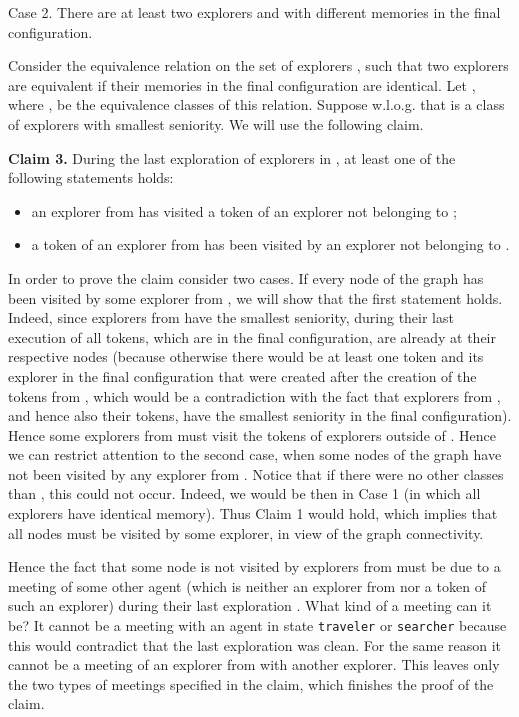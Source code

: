 \documentclass[11pt]{article}
\newcommand{\finclaim}{\hfill }
\newcommand{\qed}{\hfill  \bigbreak}
\newenvironment{proof}{\noindent {\bf Proof.}}{\qed}
\begin{document}
\begin{proof}
 \vspace*{0.2cm}
        \noindent
Case 2.  There are at least two explorers  and  with different memories in the final configuration.

Consider the equivalence relation on the set of explorers , such that two explorers are equivalent if their memories
in the final configuration are identical.
Let , where , be the equivalence classes of this relation. Suppose w.l.o.g. that  is a class of explorers with smallest
seniority. We will use the following claim.

\vspace*{0.3cm}
\noindent
{{\bf Claim 3.}}
During the last exploration  of explorers in , at least one of the following statements holds:
\begin{itemize}
\item
an explorer from  has visited a token of an explorer not belonging to ;
\item
a token of an explorer from  has been visited by an explorer not belonging to .
\end{itemize}

In order to prove the claim consider two cases. If every node of the graph has been visited by some explorer from , we will show that the
first statement holds. Indeed, since explorers from  have the smallest seniority, during their last execution of   all tokens{, which are in the final configuration,} are already at 
their respective nodes {(because otherwise there would be at least one token and its explorer in the final configuration that were created after the creation of the tokens from , which would be a contradiction with the fact that explorers from , and hence also their tokens, have the smallest seniority in the final configuration)}. Hence some explorers from  must visit the tokens of explorers outside of . Hence we can restrict attention
to the second case, when some nodes of the graph have not been visited by any explorer from . Notice that if there were no other classes than
, this could not occur. Indeed, we would be then in Case 1 (in which all explorers have identical memory). Thus Claim 1 would hold, which implies
that all nodes must be visited by some explorer, in view of the graph connectivity. 

Hence the fact that some node is not visited by explorers from  must be due to a meeting of some other agent
(which is neither an explorer from   nor a token of such an explorer) during their last exploration .
What kind of a meeting can it be? It cannot be a meeting with an agent in state {\tt traveler} or {\tt searcher} because this would contradict that the last exploration
was clean. For the same reason it cannot be a meeting of an explorer from  with another explorer. This leaves only the two types of meetings specified in the claim, which finishes the proof of the claim.\finclaim


\end{proof}
\end{document}
